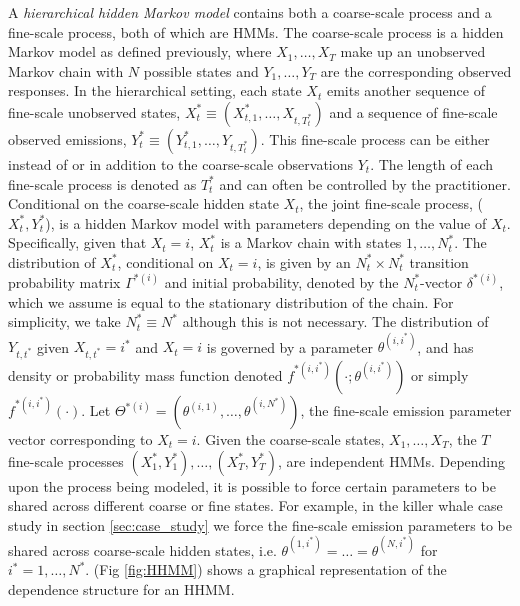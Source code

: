A \textit{hierarchical hidden Markov model} contains both a coarse-scale process and a fine-scale process, both of which are HMMs. The coarse-scale process is a hidden Markov model as defined previously, where $X_1, \ldots, X_T$ make up an unobserved Markov chain with $N$ possible states and $Y_1,\ldots, Y_T$ are the corresponding observed responses.   
%
In the hierarchical setting, each state $X_t$ emits another sequence of fine-scale unobserved states, $X_t^* \equiv (X_{t,1}^*,\ldots, X_{t,T_t^*})$ and a sequence of fine-scale observed emissions, $Y_t^* \equiv (Y_{t,1}^*,\ldots, Y_{t,T_t^*})$. This fine-scale process can be either instead of or in addition to the coarse-scale observations $Y_t$. The length of each fine-scale process is denoted as $T^*_t$ and can often be controlled by the practitioner. Conditional on the coarse-scale hidden state $X_t$, the joint fine-scale process, ($X_t^*, Y_t^*$), is a hidden Markov model with parameters depending on the value of $X_t$. Specifically, given that $X_t=i$, $X_t^*$ is a Markov chain with states $1,\ldots, N_t^*$. The distribution of $X_t^*$, conditional on $X_t=i$, is given by an $N^*_t \times N^*_t$ transition probability matrix $\Gamma^{*(i)}$ and initial probability, denoted by the $N_t^*$-vector $\delta^{*(i)}$, which we assume is equal to the stationary distribution of the chain. For simplicity, we take $N_t^* \equiv N^*$ although this is not necessary.
%
The distribution of $Y_{t, t^*}$ given $X_{t, t^*}=i^*$ and $X_t=i$ is governed by a parameter $\theta^{(i,i^*)}$, and has density or probability mass function denoted $f^{*(i,i^*)}\left(\cdot; \theta^{(i,i^*)}\right)$ or simply $f^{*(i,i^*)}(\cdot)$. Let $\Theta^{*(i)}=\left(\theta^{(i,1)}, \ldots, \theta^{(i,N^*)}\right)$, the fine-scale emission parameter vector corresponding to $X_t=i$.
%
Given the coarse-scale states, $X_1,\ldots, X_T$, the $T$ fine-scale processes $(X_1^*, Y_1^*), \ldots, (X_T^*, Y_T^*)$, are independent HMMs. Depending upon the process being modeled, it is possible to force certain parameters to be shared across different coarse or fine states. For example, in the killer whale case study in section \ref{sec:case_study} we force the fine-scale emission parameters to be shared across coarse-scale hidden states, i.e. $\theta^{(1,i^*)} = \ldots = \theta^{(N,i^*)}$ for $i^* = 1, \ldots, N^*$. (Fig \ref{fig:HHMM}) shows a graphical representation of the dependence structure for an HHMM.

